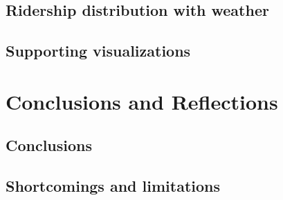 \documentclass[a4paper,12pt,english]{sphinxmanual}
\begin{document}
\section{Ridership distribution with weather}
\label{section3:ridership-distribution-with-weather}

\section{Supporting visualizations}
\label{section3:supporting-visualizations}

\chapter{Conclusions and Reflections}
\label{section4::doc}\label{section4:conclusions-and-reflections}

\section{Conclusions}
\label{section4:conclusions}

\section{Shortcomings and limitations}
\label{section4:shortcomings-and-limitations}
\end{document}
